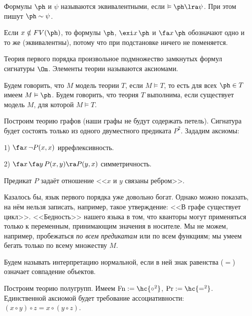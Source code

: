 \documentclass[a4paper,draft]{article}
\def\exis#1{\exi#1\,}
\def\fora#1{\fa#1\,}
\DeclareMathOperator{\Fn}{Fn}
\begin{document}
\begin{df}
  Формулы $\ph$ и $\psi$ называются эквивалентными, если $\vDash \ph \lra \psi$.
  При этом пишут $\ph \sim\psi$.
\end{df}

\begin{ex}
  Если $x \notin FV(\ph)$, то формулы $\ph$, $\exis{x}\ph$ и $\fora{x}\ph$ обозначают одно и то же (эквивалентны),
  потому что при подстановке ничего не поменяется.
\end{ex}

\begin{df}
  Теория первого порядка произвольное подмножество замкнутых формул сигнатуры $\Om$.
  Элементы теории называются аксиомами.
\end{df}

\begin{df}
  Будем говорить, что $M$ модель теории $T$, если $M \vDash T$, то есть для всех $\ph \in T$ имеем $M \vDash\ph$.
  Будем говорить, что теория $T$ выполнима, если существует модель $M$, для которой $M \vDash T$.
\end{df}

\begin{ex}
  Построим теорию графов (наши графы не будут содержать петель). Сигнатура будет состоять только из одного двуместного предиката $P^2$.
  Зададим аксиомы:

  1) $\fora{x} \neg P(x,x)$ иррефлексивность.

  2) $\fora{x}\fora{y} P(x,y) \ra P(y,x)$ симметричность.

  Предикат $P$ задаёт отношение <<$x$ и $y$ связаны ребром>>.
\end{ex}

Казалось бы, язык первого порядка уже довольно богат. Однако можно показать, на нём нельзя записать, например,
такое утверждение: <<В графе существует цикл>>. <<Бедность>> нашего языка в том, что кванторы
могут применяться только к переменным, принимающим значения в носителе. Мы не можем, например, пробежаться
\emph{по всем предикатам} или по всем функциям; мы умеем бегать только по всему множеству $M$.

\begin{df}
  Будем называть интерпретацию нормальной, если в ней знак равенства ($=$) означает совпадение объектов.
\end{df}

\begin{ex}
  Построим теорию полугрупп. Имеем $\Fn := \hc{\circ^2}$, $\Pr := \hc{=^2}$.
  Единственной аксиомой будет требование ассоциативности: $(x\circ y) \circ z = x \circ (y \circ z)$.
\end{ex}
\end{document}
